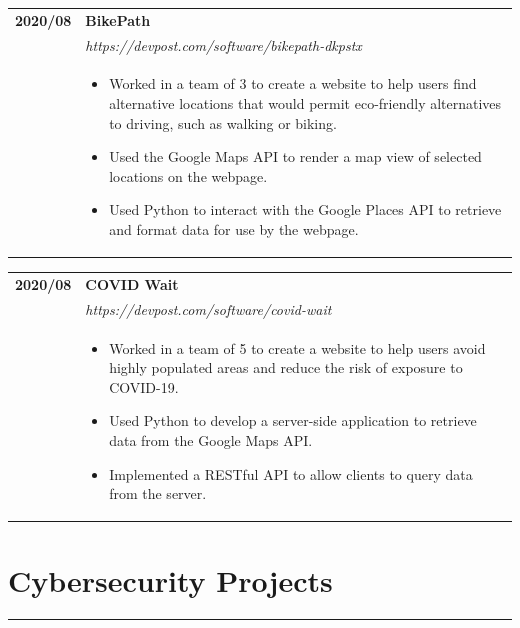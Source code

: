 \documentclass[letterpaper]{article}
\newcommand{\sect}[1]{\section*{#1}
                        {\color{cyan}
                        \rule{\textwidth}{1pt}
                        \vspace{-1ex}}}
\begin{document}
        \begin{tabular}{p{} p{}}
            \textbf{2020/08} & \textbf{BikePath} \\
            & \emph{https://devpost.com/software/bikepath-dkpstx} \\
            & \begin{itemize}
                \item Worked in a team of 3 to create a website to help users find alternative locations
                    that would permit eco-friendly alternatives to driving, such as walking or biking.
                \item Used the Google Maps API to render a map view of selected locations on the webpage.
                \item Used Python to interact with the Google Places API to retrieve and format data for
                    use by the webpage.
            \end{itemize}
            \\
        \end{tabular}

        \begin{tabular}{p{} p{}}
            \textbf{2020/08} & \textbf{COVID Wait} \\
            & \emph{https://devpost.com/software/covid-wait} \\
            & \begin{itemize}
                \item Worked in a team of 5 to create a website to help users avoid highly populated
                    areas and reduce the risk of exposure to COVID-19.
                \item Used Python to develop a server-side application to retrieve data from the Google
                    Maps API.
                \item Implemented a RESTful API to allow clients to query data from the server.
            \end{itemize}
            \\
        \end{tabular}

    \sect{Cybersecurity Projects}
\end{document}
